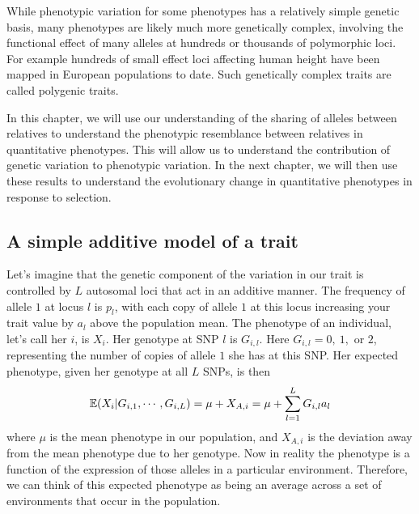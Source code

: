While phenotypic variation for some phenotypes has a relatively simple genetic basis, many phenotypes are likely much more genetically complex, involving the functional effect of many alleles at hundreds or thousands of polymorphic loci. For example hundreds of small effect loci affecting human height have been mapped in European populations to date. Such genetically complex traits are called polygenic traits. 

In this chapter, we will use our understanding of the sharing of alleles between relatives to understand the phenotypic resemblance between relatives in
quantitative phenotypes. This will allow us to understand the contribution of genetic variation to phenotypic variation. In the next chapter, we will then use these results to understand the evolutionary change in quantitative phenotypes in response to selection. \\

\subsection{A simple additive model of a trait}
Let's imagine that the genetic component of the variation in our trait is controlled by $L$ autosomal loci that act in an additive manner. The frequency of allele $1$ at locus $l$ is $p_l$, with each copy of allele $1$ at this locus increasing your trait value by $a_l$ above the population mean.
The phenotype of an individual, let's call her $i$, is $X_i$.
Her genotype at SNP $l$ is
$G_{i,l}$. Here $G_{i,l}=0,~1,$ or $2$,  representing the number of copies of allele $1$ she
has at this SNP. Her expected phenotype, given her genotype at all $L$ SNPs, is then
\begin{equation}
\mathbb{E} (X_i | G_{i,1},\cdots,G_{i,L}) =\mu + X_{A,i} = \mu+\sum_{l=1}^L G_{i,l} a_{l} \label{pheno_geno}
\end{equation}
where $\mu$ is the mean phenotype in our population, and $X_{A,i}$ is
the deviation away from the mean phenotype due to her genotype. Now in reality the phenotype is a function of the
expression of those alleles in a particular environment. Therefore, we
can think of this expected phenotype as being an average across a set
of environments that occur in the population. \\



